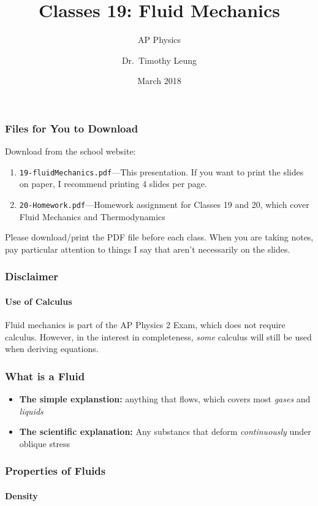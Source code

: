 \documentclass[12pt,aspectratio=169]{beamer}
\title{Classes 19: Fluid Mechanics}
\subtitle{AP Physics}
\author[TML]{Dr.\ Timothy Leung}
\institute{Olympiads School}
\date{March 2018}
\begin{document}
\begin{frame}
  \maketitle
\end{frame}



\begin{frame}
  \frametitle{Files for You to Download}
  Download from the school website:
  \begin{enumerate}
  \item\texttt{19-fluidMechanics.pdf}---This
    presentation. If you want to print the slides on paper, I recommend
    printing 4 slides per page.
  \item\texttt{20-Homework.pdf}---Homework assignment for Classes 19 and 20,
    which cover Fluid Mechanics and Thermodynamics
  \end{enumerate}

  \vspace{.2in}Please download/print the PDF file before each class. When you
  are taking notes, pay particular attention to things I say that aren't
  necessarily on the slides.
\end{frame}


\begin{frame}
  \frametitle{Disclaimer}
  \framesubtitle{Use of Calculus}
  Fluid mechanics is part of the AP Physics 2 Exam, which does not require
  calculus. However, in the interest in completeness, \emph{some} calculus will
  still be used when deriving equations.
\end{frame}


\begin{frame}
  \frametitle{What is a Fluid}

  \begin{itemize}
  \item\textbf{The simple explanstion:} anything that flows, which covers
    most \emph{gases} and \emph{liquids}
  \item\textbf{The scientific explanation:} Any substancs that deform
    \emph{continuously} under oblique stress
  \end{itemize}
\end{frame}

\begin{frame}
  \frametitle{Properties of Fluids}
  \framesubtitle{Density}
\end{frame}
\end{document}
